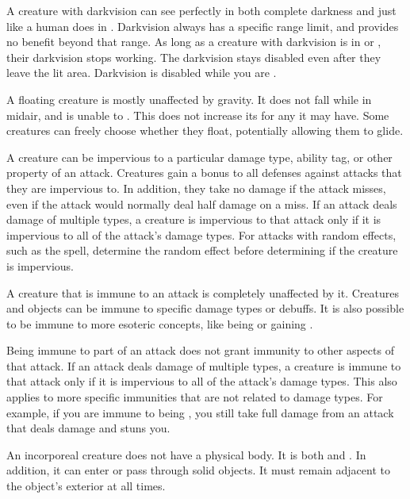   A creature with darkvision can see perfectly in both complete darkness and  just like a human does in .
  Darkvision always has a specific range limit, and provides no benefit beyond that range.
  As long as a creature with darkvision is in  or , their darkvision stops working.
  The darkvision  stays disabled even after they leave the lit area.
  Darkvision is disabled while you are \dazzled.

  A floating creature is mostly unaffected by gravity.
  It does not fall while in midair, and is unable to .
  This does not increase its  for any  it may have.
  Some creatures can freely choose whether they float, potentially allowing them to glide.

  A creature can be impervious to a particular damage type, ability tag, or other property of an attack.
  Creatures gain a  bonus to all defenses against attacks that they are impervious to.
  In addition, they take no damage if the attack misses, even if the attack would normally deal half damage on a miss.
  If an attack deals damage of multiple types, a creature is impervious to that attack only if it is impervious to all of the attack's damage types.
  For attacks with random effects, such as the  spell, determine the random effect before determining if the creature is impervious.

  A creature that is immune to an attack is completely unaffected by it.
  Creatures and objects can be immune to specific damage types or debuffs.
  It is also possible to be immune to more esoteric concepts, like being \grappled or gaining .

  Being immune to part of an attack does not grant immunity to other aspects of that attack.
  If an attack deals damage of multiple types, a creature is immune to that attack only if it is impervious to all of the attack's damage types.
  This also applies to more specific immunities that are not related to damage types.
  For example, if you are immune to being \stunned, you still take full damage from an attack that deals damage and stuns you.

  An incorporeal creature does not have a physical body.
  It is both  and .
  In addition, it can enter or pass through solid objects.
  It must remain adjacent to the object's exterior at all times.

